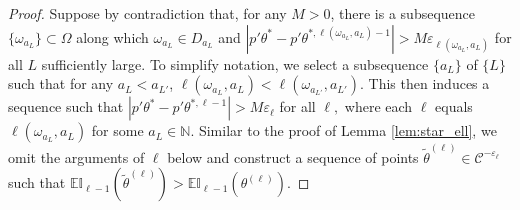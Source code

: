 \documentclass[letterpaper,11pt]{article}
\theoremstyle{myplain}
\theoremstyle{mydefinition}
\theoremstyle{myremark}
\numberwithin{equation}{section}
\numberwithin{figure}{section}
\begin{document}
\begin{appendix}
\begin{proof}
Suppose by contradiction that, for any $M>0$, there is a  subsequence $\{\omega_{a_L}\}\subset \Omega$ along which $\omega_{a_L}\in D_{a_L}$ and $|p'\theta^*-p'\theta^{*,\ell(\omega_{a_L},a_L)-1}|>M\varepsilon_{\ell(\omega_{a_L},a_L)}$ for all $L$ sufficiently large. To simplify notation, we select a subsequence $\{a_L\}$ of $\{L\}$  such that
 for any $a_L<a_{L'}$, $\ell(\omega_{a_L},a_L)<\ell(\omega_{a_{L'}},a_{L'})$. This then  induces a sequence  such that    $|p'\theta^*-p'\theta^{*,\ell-1}|>M\varepsilon_\ell$ for all $\ell,$ where each $\ell$ equals $\ell(\omega_{a_L},a_L)$ for some $a_L\in\mathbb N$.
Similar to the proof of Lemma \ref{lem:star_ell}, we omit the arguments of $\ell$ below and construct a sequence of points $\tilde\theta^{(\ell)}\in\mathcal C^{-\varepsilon_{\ell}}$ such that $\mathbb{EI}_{\ell-1}(\tilde\theta^{(\ell)})>\mathbb{EI}_{\ell-1}(\theta^{(\ell)})$.


\end{proof}
\end{appendix}
\end{document}
